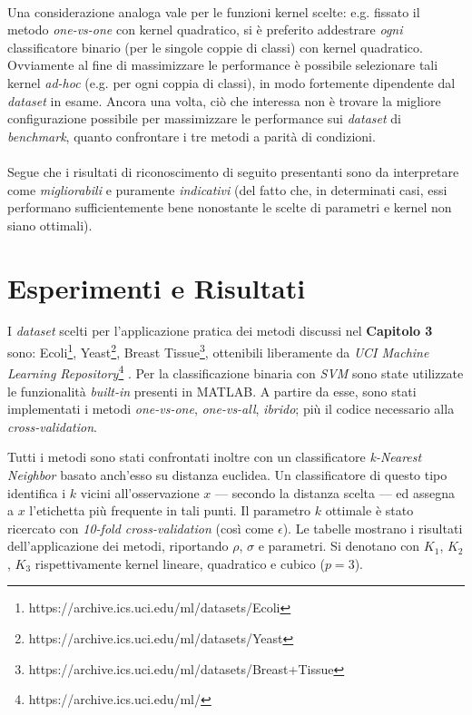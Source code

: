 \paragraph{}
Una considerazione analoga vale per le funzioni kernel scelte:
e.g. fissato il metodo \textit{one-vs-one} con kernel quadratico, si è preferito addestrare \textit{ogni} classificatore binario (per le singole coppie di classi) con kernel quadratico.
Ovviamente al fine di massimizzare le performance è possibile selezionare tali kernel \textit{ad-hoc} (e.g. per ogni coppia di classi), in modo fortemente dipendente dal \textit{dataset} in esame. Ancora una volta, ciò che interessa non è trovare la migliore configurazione possibile per massimizzare le performance sui \textit{dataset} di \textit{benchmark}, quanto confrontare i tre metodi a parità di condizioni.

\paragraph{}
Segue che i risultati di riconoscimento di seguito presentanti sono da interpretare come \textit{migliorabili} e puramente \textit{indicativi} (del fatto che, in determinati casi, essi performano sufficientemente bene nonostante le scelte di parametri e kernel non siano ottimali). 


\section{Esperimenti e Risultati}

I \textit{dataset} scelti per l'applicazione pratica dei metodi discussi nel \textbf{Capitolo 3} sono: Ecoli\footnote{https://archive.ics.uci.edu/ml/datasets/Ecoli}, Yeast\footnote{https://archive.ics.uci.edu/ml/datasets/Yeast}, Breast Tissue\footnote{https://archive.ics.uci.edu/ml/datasets/Breast+Tissue}, ottenibili liberamente da \textit{UCI Machine Learning Repository}\footnote{https://archive.ics.uci.edu/ml/} \cite{uciml}.
Per la classificazione binaria con \textit{SVM} sono state utilizzate le funzionalità \textit{built-in} presenti in MATLAB.
A partire da esse, sono stati implementati i metodi \textit{one-vs-one}, \textit{one-vs-all}, \textit{ibrido}; più il codice necessario alla \textit{cross-validation}.

Tutti i metodi sono stati confrontati inoltre con un classificatore \textit{k-Nearest Neighbor} basato anch'esso su distanza euclidea. Un classificatore di questo tipo identifica i $k$ vicini all'osservazione $x$ --- secondo la distanza scelta --- ed assegna a $x$ l'etichetta più frequente in tali punti. Il parametro $k$ ottimale è stato ricercato con \textit{10-fold cross-validation} (così come $\epsilon$).
Le tabelle mostrano i risultati dell'applicazione dei metodi, riportando $\rho$, $\sigma$ e parametri. Si denotano con $K_1$, $K_2$, $K_3$ rispettivamente kernel lineare, quadratico e cubico ($p = 3$).


